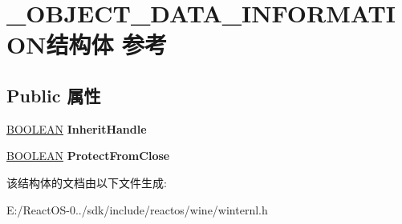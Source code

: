 \hypertarget{struct___o_b_j_e_c_t___d_a_t_a___i_n_f_o_r_m_a_t_i_o_n}{}\section{\+\_\+\+O\+B\+J\+E\+C\+T\+\_\+\+D\+A\+T\+A\+\_\+\+I\+N\+F\+O\+R\+M\+A\+T\+I\+O\+N结构体 参考}
\label{struct___o_b_j_e_c_t___d_a_t_a___i_n_f_o_r_m_a_t_i_o_n}
\subsection*{Public 属性}
\begin{DoxyCompactItemize}
\item 
\mbox{\label{struct___o_b_j_e_c_t___d_a_t_a___i_n_f_o_r_m_a_t_i_o_n_a4dbad58673e7eff47e2e35b6e245e73d}} 
\hyperlink{_processor_bind_8h_a112e3146cb38b6ee95e64d85842e380a}{B\+O\+O\+L\+E\+AN} {\bfseries Inherit\+Handle}
\item 
\mbox{\label{struct___o_b_j_e_c_t___d_a_t_a___i_n_f_o_r_m_a_t_i_o_n_a73310f22b4f4e6135b4b4fe18735cb44}} 
\hyperlink{_processor_bind_8h_a112e3146cb38b6ee95e64d85842e380a}{B\+O\+O\+L\+E\+AN} {\bfseries Protect\+From\+Close}
\end{DoxyCompactItemize}


该结构体的文档由以下文件生成\+:\begin{DoxyCompactItemize}
\item 
E\+:/\+React\+O\+S-\/0../sdk/include/reactos/wine/winternl.\+h\end{DoxyCompactItemize}
